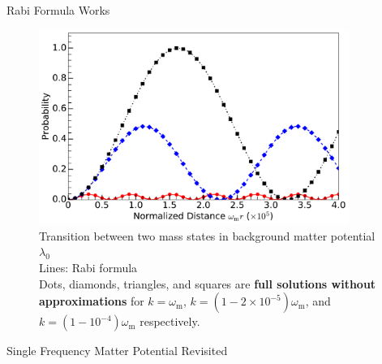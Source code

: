 \documentclass[9pt]{beamer}
\begin{document}
\begin{darkframes}
\begin{frame}{Rabi Formula Works}

\begin{tcolorbox}[colback=white]
\begin{figure}
\includegraphics[width=0.9\textwidth]{assets/rabiOscillationsNeutrinoCoincidence-single-frequency}
\caption*{
\color{black}Transition between two mass states in background matter potential $\lambda_0$\\
Lines: Rabi formula\\
Dots, diamonds, triangles, and squares are {\bf full solutions without approximations} for {\color{black}$k=\omega_{\mathrm m}$}, {\color{blue}$k=(1-2\times 10^{-5})\omega_{\mathrm m}$}, and {\color{red}$k=(1-10^{-4})\omega_{\mathrm m}$} respectively.
}
\end{figure}
\end{tcolorbox}

\end{frame}





\begin{frame}{Single Frequency Matter Potential Revisited}


\end{frame}
\end{darkframes}
\end{document}

